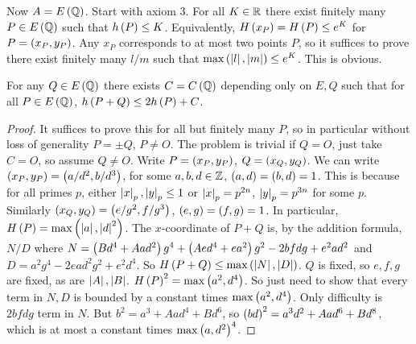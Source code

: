 Now $ A = E\left( \mathbb{Q} \right) $. Start with axiom $ 3 $. For all $ K \in \mathbb{R} $ there exist finitely many $ P \in E\left( \mathbb{Q} \right) $ such that $ h\left( P \right) \le K $. Equivalently, $ H\left( x_P \right) = H\left( P \right) \le e^K $ for $ P = \left( x_P, y_P \right) $. Any $ x_P $ corresponds to at most two points $ P $, so it suffices to prove there exist finitely many $ l / m $ such that $ \max\left( \left\lvert l \right\rvert, \left\lvert m \right\rvert \right) \le e^K $. This is obvious.

\begin{lemma}
For any $ Q \in E\left( \mathbb{Q} \right) $ there exists $ C = C\left( \mathbb{Q} \right) $ depending only on $ E, Q $ such that for all $ P \in E\left( \mathbb{Q} \right) $, $ h\left( P + Q \right) \le 2h\left( P \right) + C $.
\end{lemma}

\pagebreak

\begin{proof}
It suffices to prove this for all but finitely many $ P $, so in particular without loss of generality $ P = \pm Q $, $ P \ne O $. The problem is trivial if $ Q = O $, just take $ C = O $, so assume $ Q \ne O $. Write $ P = \left( x_P, y_P \right) $, $ Q = \left( x_Q, y_Q \right) $. We can write $ \left( x_P, y_P \right) = \left( a / d^2, b / d^3 \right) $, for some $ a, b, d \in \mathbb{Z} $, $ \left( a, d \right) = \left( b, d \right) = 1 $. This is because for all primes $ p $, either $ \left\lvert x \right\rvert_p, \left\lvert y \right\rvert_p \le 1 $ or $ \left\lvert x \right\rvert_p = p^{2n} $, $ \left\lvert y \right\rvert_p = p^{3n} $ for some $ p $. Similarly $ \left( x_Q, y_Q \right) = \left( e / g^2, f / g^3 \right) $, $ \left( e, g \right) = \left( f, g \right) = 1 $. In particular, $ H\left( P \right) = \max\left( \left\lvert a \right\rvert, \left\lvert d \right\rvert^2 \right) $. The $ x $-coordinate of $ P + Q $ is, by the addition formula, $ N / D $ where $ N = \left( Bd^4 + Aad^2 \right)g^4 + \left( Aed^4 + ea^2 \right)g^2 - 2bfdg + e^2ad^2 $ and $ D = a^2g^4 - 2ead^2g^2 + e^2d^4 $. So $ H\left( P + Q \right) \le \max\left( \left\lvert N \right\rvert, \left\lvert D \right\rvert \right) $. $ Q $ is fixed, so $ e, f, g $ are fixed, as are $ \left\lvert A \right\rvert, \left\lvert B \right\rvert $. $ H\left( P \right)^2 = \max\left( a^2, d^4 \right) $. So just need to show that every term in $ N, D $ is bounded by a constant times $ \max\left( a^2, d^4 \right) $. Only difficulty is $ 2bfdg $ term in $ N $. But $ b^2 = a^3 + Aad^4 + Bd^6 $, so $ \left( bd \right)^2 = a^3d^2 + Aad^6 + Bd^8 $, which is at most a constant times $ \max\left( a, d^2 \right)^4 $.
\end{proof}


